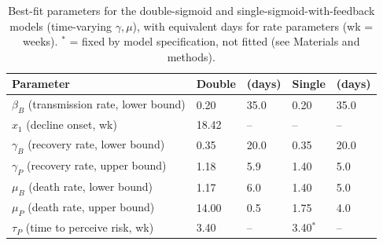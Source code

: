 \begin{table}[t]
    \centering
    \small
    \caption{Best-fit parameters for the double-sigmoid and single-sigmoid-with-feedback models (time-varying $\gamma,\mu$), with equivalent days for rate parameters (wk = weeks). $^*$ = fixed by model specification, not fitted (see Materials and methods).}
    \begin{tabular}{@{\hskip 3pt}p{2.4cm}@{\hskip 6pt}p{1.6cm}@{\hskip 1pt}p{1.3cm}@{\hskip 10pt}p{1.6cm}@{\hskip 1pt}p{1.3cm}}
        \toprule
        \textbf{Parameter} & \textbf{Double} & \textbf{(days)} & \textbf{Single} & \textbf{(days)} \\
        \midrule
        $\beta_B$ (transmission rate, lower bound) & 0.20 & 35.0 & 0.20 & 35.0 \\
        $x_1$ (decline onset, wk) & 18.42 & -- & -- & -- \\
        $\gamma_B$ (recovery rate, lower bound) & 0.35 & 20.0 & 0.35 & 20.0 \\
        $\gamma_P$ (recovery rate, upper bound) & 1.18 & 5.9 & 1.40 & 5.0 \\
        $\mu_B$ (death rate, lower bound) & 1.17 & 6.0 & 1.40 & 5.0 \\
        $\mu_P$ (death rate, upper bound) & 14.00 & 0.5 & 1.75 & 4.0 \\
        $\tau_P$ (time to perceive risk, wk) & 3.40 & -- & 3.40$^*$ & -- \\
        \bottomrule
    \end{tabular}
    \label{tab:main_params}
\end{table}
